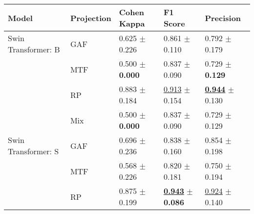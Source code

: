 
\begin{tabular}{lllll}
\toprule
Model & Projection & Cohen Kappa & F1 Score & Precision \\
\midrule
Swin Transformer: B & GAF & \textcolor[rgb]{0.6842105263,0.3157894737,0}{0.625} $\pm$ \textcolor[rgb]{0.8660254038,0.1339745962,0}{0.226} & \textcolor[rgb]{0.4608501119,0.5000000000,0}{0.861} $\pm$ \textcolor[rgb]{0.2381568728,0.5000000000,0}{0.110} & \textcolor[rgb]{0.7096774194,0.2903225806,0}{0.792} $\pm$ \textcolor[rgb]{0.7294531592,0.2705468408,0}{0.179} \\
 & MTF & \textcolor[rgb]{1.0000000000,0.0000000000,0}{0.500} $\pm$ \textbf{\textcolor[rgb]{0.0000000000,0.5000000000,0}{0.000}} & \textcolor[rgb]{0.5950782998,0.4049217002,0}{0.837} $\pm$ \textcolor[rgb]{0.0338709016,0.5000000000,0}{0.090} & \textcolor[rgb]{1.0000000000,0.0000000000,0}{0.729} $\pm$ \textbf{\textcolor[rgb]{0.0000000000,0.5000000000,0}{0.129}} \\
 & RP & \textcolor[rgb]{0.0315789474,0.5000000000,0}{0.883} $\pm$ \textcolor[rgb]{0.7039570694,0.2960429306,0}{0.184} & \underline{\textcolor[rgb]{0.1677852349,0.5000000000,0}{0.913}} $\pm$ \textcolor[rgb]{0.6684556411,0.3315443589,0}{0.154} & \underline{\textbf{\textcolor[rgb]{0.0000000000,0.5000000000,0}{0.944}}} $\pm$ \textcolor[rgb]{0.0146408820,0.5000000000,0}{0.130} \\
 & Mix & \textcolor[rgb]{1.0000000000,0.0000000000,0}{0.500} $\pm$ \textbf{\textcolor[rgb]{0.0000000000,0.5000000000,0}{0.000}} & \textcolor[rgb]{0.5950782998,0.4049217002,0}{0.837} $\pm$ \textcolor[rgb]{0.0338709016,0.5000000000,0}{0.090} & \textcolor[rgb]{1.0000000000,0.0000000000,0}{0.729} $\pm$ \textcolor[rgb]{0.0000000000,0.5000000000,0}{0.129} \\
Swin Transformer: S & GAF & \textcolor[rgb]{0.5052631579,0.4947368421,0}{0.696} $\pm$ \textcolor[rgb]{0.9035424112,0.0964575888,0}{0.236} & \textcolor[rgb]{0.5883668904,0.4116331096,0}{0.838} $\pm$ \textcolor[rgb]{0.7289096871,0.2710903129,0}{0.160} & \textcolor[rgb]{0.4193548387,0.5000000000,0}{0.854} $\pm$ \textcolor[rgb]{1.0000000000,0.0000000000,0}{0.198} \\
 & MTF & \textcolor[rgb]{0.8277511962,0.1722488038,0}{0.568} $\pm$ \textcolor[rgb]{0.8660254038,0.1339745962,0}{0.226} & \textcolor[rgb]{0.6931055522,0.3068944478,0}{0.820} $\pm$ \textcolor[rgb]{0.9386830080,0.0613169920,0}{0.181} & \textcolor[rgb]{0.9032258065,0.0967741935,0}{0.750} $\pm$ \textcolor[rgb]{0.9339473934,0.0660526066,0}{0.194} \\
 & RP & \textcolor[rgb]{0.0526315789,0.5000000000,0}{0.875} $\pm$ \textcolor[rgb]{0.7637626158,0.2362373842,0}{0.199} & \underline{\textbf{\textcolor[rgb]{0.0000000000,0.5000000000,0}{0.943}}} $\pm$ \textbf{\textcolor[rgb]{0.0000000000,0.5000000000,0}{0.086}} & \underline{\textcolor[rgb]{0.0967741935,0.5000000000,0}{0.924}} $\pm$ \textcolor[rgb]{0.1578953607,0.5000000000,0}{0.140} \\

\end{tabular}
